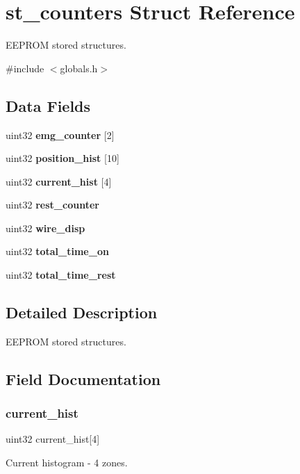 \section{st\+\_\+counters Struct Reference}
\label{structst__counters}


E\+E\+P\+R\+OM stored structures.  




{\ttfamily \#include $<$globals.\+h$>$}

\subsection*{Data Fields}
\begin{DoxyCompactItemize}
\item 
uint32 \textbf{ emg\+\_\+counter} [2]
\item 
uint32 \textbf{ position\+\_\+hist} [10]
\item 
uint32 \textbf{ current\+\_\+hist} [4]
\item 
uint32 \textbf{ rest\+\_\+counter}
\item 
uint32 \textbf{ wire\+\_\+disp}
\item 
uint32 \textbf{ total\+\_\+time\+\_\+on}
\item 
uint32 \textbf{ total\+\_\+time\+\_\+rest}
\end{DoxyCompactItemize}


\subsection{Detailed Description}
E\+E\+P\+R\+OM stored structures. 



\subsection{Field Documentation}
\mbox{\label{structst__counters_a5fbf9566abdebf78712e7986d399e749}} 
\subsubsection{current\+\_\+hist}
{\footnotesize\ttfamily uint32 current\+\_\+hist[4]}

Current histogram -\/ 4 zones. \mbox{\label{structst__counters_a4f0e42865ba18f09c8cd90f8cd36534c}} 
